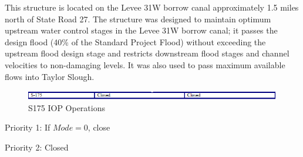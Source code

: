 This structure is located on the Levee 31W borrow canal approximately 1.5 miles north of State Road 27. The structure was designed to maintain optimum upstream water control stages in the Levee 31W borrow canal; it passes the design flood (40\% of the Standard Project Flood) without exceeding the upstream flood design stage and restricts downstream flood stages and channel velocities to non-damaging levels. It was also used to pass maximum available flows into Taylor Slough.



\begin{figure}[!h]
  \begin{center}
  \includegraphics[width=6.5in]{../figs/S175_IOPops.png}
  \caption{S175 IOP Operations}
  \label{fig:S175iop}
  \end{center}
\end{figure}


\begin{packed_items}
\item Priority 1: If $Mode=0$, close
\item Priority 2: Closed
\end{packed_items}


